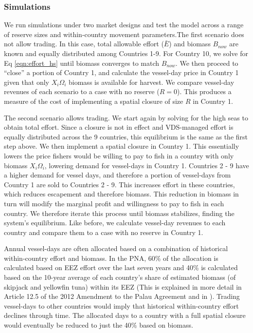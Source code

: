 \documentclass[12pt]{article}
\begin{document}
\subsubsection{Simulations}

We run simulations under two market designs and test the model across a range of reserve sizes and within-country movement parameters.The first scenario does not allow trading. In this case, total allowable effort ($\bar{E}$) and biomass $B_{now}$ are known and equally distributed among Countries 1-9. For Country 10, we solve for Eq \ref{eqn:effort_hs} until biomass converges to match $B_{now}$. We then proceed to ``close'' a portion of Country 1, and calculate the vessel-day price in Country 1 given that only $X_i\Omega_i$ biomass is available for harvest. We compare vessel-day revenues of each scenario to a case with no reserve ($R = 0$). This produces a measure of the cost of implementing a spatial closure of size $R$ in Country 1.

The second scenario allows trading. We start again by solving for the high seas to obtain total effort. Since a closure is not in effect and VDS-managed effort is equally distributed across the 9 countries, this equilibrium is the same as the first step above. We then implement a spatial closure in Country 1. This essentially lowers the price fishers would be willing to pay to fish in a country with only biomass $X_i\Omega_i$, lowering demand for vessel-days in Country 1. Countries 2 - 9 have a higher demand for vessel days, and therefore a portion of vessel-days from Country 1 are sold to Countries 2 - 9. This increases effort in these countries, which reduces escapement and therefore biomass. This reduction in biomass in turn will modify the marginal profit and willingness to pay to fish in each country. We therefore iterate this process until biomass stabilizes, finding the system's equilibrium. Like before, we calculate vessel-day revenues to each country and compare them to a case with no reserve in Country 1.

Annual vessel-days are often allocated based on a combination of historical within-country effort and biomass. In the PNA, 60\% of the allocation is calculated based on EEZ effort over the last seven years and 40\% is calculated based on the 10-year average of each country’s share of estimated biomass (of skipjack and yellowfin tuna) within its EEZ (This is explained in more detail in Article 12.5 of the 2012 Amendment to the Palau Agreement and in \cite{Hagrannsoknir2014}). Trading vessel-days to other countries would imply that historical within-country effort declines through time. The allocated days to a country with a full spatial closure would eventually be reduced to just the 40\% based on biomass.
\end{document}
